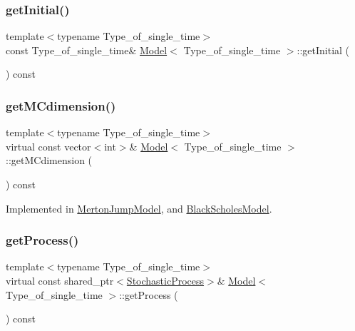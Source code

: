 \hypertarget{class_model_a22cdf510508e6cf3adc69e2bcd9d151e}{}\label{class_model_a22cdf510508e6cf3adc69e2bcd9d151e} 
\subsubsection{\texorpdfstring{get\+Initial()}{getInitial()}}
{\footnotesize\ttfamily template$<$typename Type\+\_\+of\+\_\+single\+\_\+time$>$ \\
const Type\+\_\+of\+\_\+single\+\_\+time\& \hyperlink{class_model}{Model}$<$ Type\+\_\+of\+\_\+single\+\_\+time $>$\+::get\+Initial (\begin{DoxyParamCaption}{ }\end{DoxyParamCaption}) const\hspace{0.3cm}{\ttfamily [inline]}}

\hypertarget{class_model_a11fb36244c91ca8c36317581b73bca08}{}\label{class_model_a11fb36244c91ca8c36317581b73bca08} 
\subsubsection{\texorpdfstring{get\+M\+Cdimension()}{getMCdimension()}}
{\footnotesize\ttfamily template$<$typename Type\+\_\+of\+\_\+single\+\_\+time$>$ \\
virtual const vector$<$int$>$\& \hyperlink{class_model}{Model}$<$ Type\+\_\+of\+\_\+single\+\_\+time $>$\+::get\+M\+Cdimension (\begin{DoxyParamCaption}{ }\end{DoxyParamCaption}) const\hspace{0.3cm}{\ttfamily [pure virtual]}}



Implemented in \hyperlink{class_merton_jump_model_a6f901e305a9b852fd69aa7c6ff5da728}{Merton\+Jump\+Model}, and \hyperlink{class_black_scholes_model_a5665e6ea247e4f243082f5c98bbdbad6}{Black\+Scholes\+Model}.

\hypertarget{class_model_a6f584114ffcbd4eac04a2bbf8e9cede2}{}\label{class_model_a6f584114ffcbd4eac04a2bbf8e9cede2} 
\subsubsection{\texorpdfstring{get\+Process()}{getProcess()}\hspace{0.1cm}{\footnotesize\ttfamily [1/2]}}
{\footnotesize\ttfamily template$<$typename Type\+\_\+of\+\_\+single\+\_\+time$>$ \\
virtual const shared\+\_\+ptr$<$\hyperlink{class_stochastic_process}{Stochastic\+Process}$>$\& \hyperlink{class_model}{Model}$<$ Type\+\_\+of\+\_\+single\+\_\+time $>$\+::get\+Process (\begin{DoxyParamCaption}{ }\end{DoxyParamCaption}) const\hspace{0.3cm}{\ttfamily [pure virtual]}}



